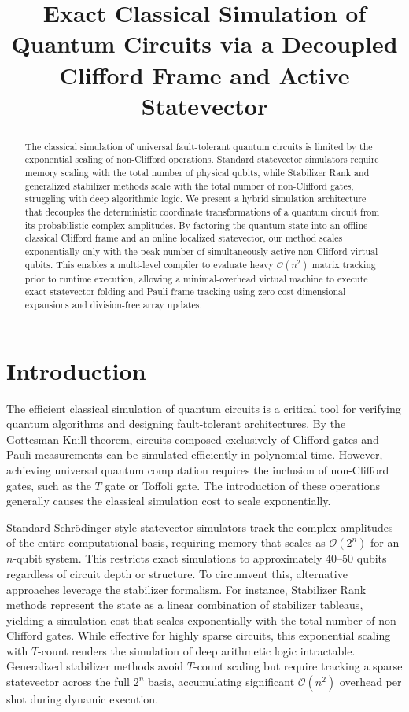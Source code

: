 \documentclass[11pt]{article}
\title{Exact Classical Simulation of Quantum Circuits via a Decoupled Clifford Frame and Active Statevector}
\author{}
\date{}
\begin{document}
\maketitle

\begin{abstract}
\noindent The classical simulation of universal fault-tolerant quantum circuits is limited by the exponential scaling of non-Clifford operations. Standard statevector simulators require memory scaling with the total number of physical qubits, while Stabilizer Rank and generalized stabilizer methods scale with the total number of non-Clifford gates, struggling with deep algorithmic logic. We present a hybrid simulation architecture that decouples the deterministic coordinate transformations of a quantum circuit from its probabilistic complex amplitudes. By factoring the quantum state into an offline classical Clifford frame and an online localized statevector, our method scales exponentially only with the peak number of simultaneously active non-Clifford virtual qubits. This enables a multi-level compiler to evaluate heavy $\mathcal{O}(n^2)$ matrix tracking prior to runtime execution, allowing a minimal-overhead virtual machine to execute exact statevector folding and Pauli frame tracking using zero-cost dimensional expansions and division-free array updates.
\end{abstract}

\section{Introduction}

The efficient classical simulation of quantum circuits is a critical tool for verifying quantum algorithms and designing fault-tolerant architectures. By the Gottesman-Knill theorem, circuits composed exclusively of Clifford gates and Pauli measurements can be simulated efficiently in polynomial time. However, achieving universal quantum computation requires the inclusion of non-Clifford gates, such as the $T$ gate or Toffoli gate. The introduction of these operations generally causes the classical simulation cost to scale exponentially.

Standard Schrödinger-style statevector simulators track the complex amplitudes of the entire computational basis, requiring memory that scales as $\mathcal{O}(2^n)$ for an $n$-qubit system. This restricts exact simulations to approximately 40--50 qubits regardless of circuit depth or structure. To circumvent this, alternative approaches leverage the stabilizer formalism. For instance, Stabilizer Rank methods \cite{bravyi2019} represent the state as a linear combination of stabilizer tableaus, yielding a simulation cost that scales exponentially with the total number of non-Clifford gates. While effective for highly sparse circuits, this exponential scaling with $T$-count renders the simulation of deep arithmetic logic intractable. Generalized stabilizer methods \cite{yoder2012, li2025soft} avoid $T$-count scaling but require tracking a sparse statevector across the full $2^n$ basis, accumulating significant $\mathcal{O}(n^2)$ overhead per shot during dynamic execution.
\end{document}
